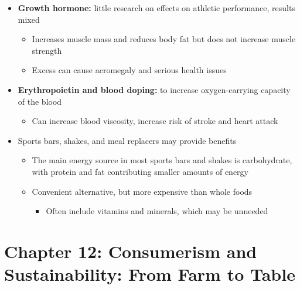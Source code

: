 \documentclass[12pt]{article}
\begin{document}
\begin{itemize}
                \item \textbf{Growth hormone:} little research on effects on athletic performance, results mixed
                    \begin{itemize}
                        \item Increases muscle mass and reduces body fat but does not increase muscle strength
                        \item Excess can cause acromegaly and serious health issues
                    \end{itemize}
                \item \textbf{Erythropoietin and blood doping:} to increase oxygen-carrying capacity of the blood
                    \begin{itemize}
                        \item Can increase blood viscosity, increase risk of stroke and heart attack
                    \end{itemize}
                \item Sports bars, shakes, and meal replacers may provide benefits
                    \begin{itemize}
                        \item The main energy source in most sports bars and shakes is carbohydrate, with protein and fat contributing smaller amounts of energy
                        \item Convenient alternative, but more expensive than whole foods
                            \begin{itemize}
                                \item Often include vitamins and minerals, which may be unneeded
                            \end{itemize}
                    \end{itemize}
            \end{itemize}

        
    \section{Chapter 12: Consumerism and Sustainability: From Farm to Table}
        
\end{document}
